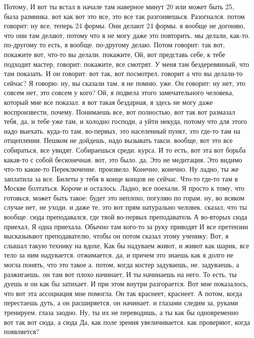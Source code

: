 Потому, И вот ты встал в начале там наверное минут 20 или может быть 25, была разминка. вот как вот это все, это все так разгоняешься.
Разогнался. потом говорит: ну все, теперь 24 формы.
Они делают 24 формы. я вообще не догоняю, что они там делают, потому что я не могу даже это повторить. мы делали, как-то.
по-другому то есть, я вообще.
по-другому делаю.
Потом говорит: так вот, покажите вот, что-то вы делали. покажите, Ой, вот представь себе, к тебе подходит мастер, говорит: покажите, все смотрят.
У меня там бездеревянный, что там показать.
И он говорит: вот так, вот посмотрел. говорит а что вы делали-то сейчас?
Я говорю: ну, вы сказали там.
я не помню.
уже.
Он говорит: ну нет, это совсем нет, это совсем у кого? Ой, я подвела этого замечательного человека, который мне все показал. я вот такая бездарная, я здесь не могу даже воспроизвести, почему.
Понимаешь все, вот полностью, вот так вот размазал тебя, да, и тебе уже там, и холодно господи, а уйти некуда, потому что для этого надо выехать.
куда-то там. во-первых, это населенный пункт, это где-то там на отщеплении.
Пешком не дойдешь, надо вызывать такси. вообще, вот это все собираться, все увидят.
Собираешься среди.
курса. И то есть, вот эта вот борьба какая-то с собой бесконечная.
вот, это было. да, Это не медитация.
Это видимо что-то какие-то Переключение.
произвело.
Конечно, конечно.
Ну ладно, ты же заплатила за все.
Билеты у тебя в конце концов не сейчас.
Что-то где-то там в Москве болтаться.
Короче и осталось.
Ладно, все поехали.
Я просто к тому, что готовься, может быть такое:
будет это неплохо, погуляю по горам. ну, во всяком случае нет, не уходи. и даже те, это вот прям натурально человек.
сказал, что ты вообще.
сюда преподавался, где твой во-первых преподаватель А во-вторых
сюда приехал, Я одна приехала.
Обычно там кого-то за руку приводят И все претензии высказывают преподавателю, чтобы он потом сказал этому ученику: Вот, я слышал такую технику на вдохе, Как бы надуваем живот, и живот как шарик, все тело за ним надувается.
отжимается. да, и причем это знаешь как я долго не могла понять, что это такое а.
потом, когда костер задуваешь, не.
задуваешь, а разжигаешь. он там вот плохо начинает, И ты начинаешь на него.
То есть, ты дуешь и он как бы затихает.
И при этом внутри разгорается. Вот мне показалось, что вот эта ассоциация мне помогла.
Он так краснеет, краснеет.
А потом, когда перестаешь дуть, а он расширяется, он начинает.
и глазами следим за, руками тренируем.
глаза заодно. Ну, ты их не переводишь, а ты как бы одновременно вот так вот сюда, а сюда Да, как поле зрения увеличивается.
как проверяют, когда появляется?
